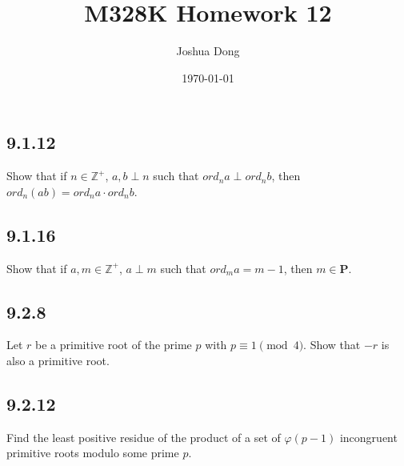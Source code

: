 \documentclass{article}
\begin{document}
\title{M328K\: Homework 12}
\author{Joshua Dong}
\date{\today}
\maketitle

\subsection{9.1.12}
Show that if $n \in \mathbb{Z}^+$, $a, b \perp n$ such that
$ord_n a \perp ord_n b$, then $ord_n (ab) = ord_n a \cdot ord_n b$.
\\

\subsection{9.1.16}
Show that if $a, m \in \mathbb{Z}^+$, $a \perp m$ such that
$ord_m a = m-1$, then $m \in \textbf{P}$.
\\

\subsection{9.2.8}
Let $r$ be a primitive root of the prime $p$ with $p \equiv 1 \pmod4$.
Show that $-r$ is also a primitive root.

\subsection{9.2.12}
Find the least positive residue of the product of a set of $\varphi(p-1)$
incongruent primitive roots modulo some prime $p$.

\end{document}
